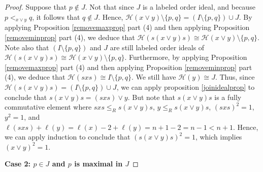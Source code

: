 \documentclass[10pt,a4paper]{amsart}
\def\H#1{\mathcal{H}(#1)}
\def\weakr{\leq_{R}}
\begin{document}
\begin{proof}
    
    Suppose that $ p \notin J$. Not that since $J$ is a labeled order ideal, and because $ p <_{x\vee y} q$, it follows that $ q\notin J$. Hence, $ \H{x\vee y} \setminus \{ p,q \} = (I \setminus \{  p,q \} ) \cup J$. By applying Proposition \ref{removemaxprop} part (4) and then applying Proposition \ref{removeminprop} part (4), we deduce that $ \H{s(x\vee y)s} \cong \H{x\vee y} \setminus \{ p,q \} $. Note also that $ (I \setminus \{  p,q \} )$ and $J$ are still labeled order ideals of $\H{s(x\vee y)s} \cong \H{x\vee y} \setminus \{ p,q \} $. Furthermore, by applying Proposition \ref{removemaxprop} part (4) and then applying Proposition \ref{removeminprop} part (4), we deduce that $ \H{sxs} \cong I \setminus \{ p,q \}$. We still have $ \H{y} \cong J$. Thus, since $ \H{s(x\vee y )s} = (I \setminus \{  p,q \} ) \cup J$, we can apply proposition \ref{joinidealprop} to conclude that $ s(x\vee y)s = (sxs)\vee y$. But note that $ s(x\vee y)s$ is a fully commutative element where $ sxs \weakr s(x\vee y)s$, $ y \weakr s(x\vee y)s$, $ (sxs)^{2}=1$, $ y^{2}=1$, and $ \ell(sxs) + \ell(y) = \ell(x) -2 +\ell(y) =n+1 - 2 = n-1< n+1$. Hence, we can apply induction to conclude that $ (s(x\vee y)s)^{2} = 1$, which implies $ (x\vee y)^{2} = 1$. 

    \textbf{Case 2: $ p \in J$ and $ p$ is maximal in $J$}


\end{proof}
\end{document}
